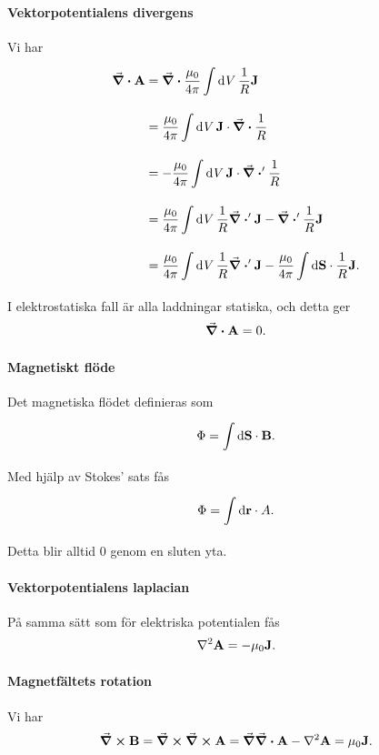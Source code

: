 \paragraph{Vektorpotentialens divergens}
Vi har
\begin{align*}
	\div{\vb{A}} &= \div{\frac{\mu_{0}}{4\pi}\int\limits_{}^{}\dd[]{V}\frac{1}{R}\vb{J}} \\
	             &= \frac{\mu_{0}}{4\pi}\int\limits_{}^{}\dd[]{V}\vb{J}\cdot\div{\frac{1}{R}} \\
	             &= -\frac{\mu_{0}}{4\pi}\int\limits_{}^{}\dd[]{V}\vb{J}\cdot\div'{\frac{1}{R}} \\
	             &= \frac{\mu_{0}}{4\pi}\int\limits_{}^{}\dd[]{V}\frac{1}{R}\div'{\vb{J}} - \div'{\frac{1}{R}\vb{J}} \\
	             &= \frac{\mu_{0}}{4\pi}\int\limits_{}^{}\dd[]{V}\frac{1}{R}\div'{\vb{J}} -  \frac{\mu_{0}}{4\pi}\int\limits_{}^{}\dd{\vb{S}}\cdot \frac{1}{R}\vb{J}.
\end{align*}
I elektrostatiska fall är alla laddningar statiska, och detta ger
\begin{align*}
	\div{\vb{A}} = 0.
\end{align*}

\paragraph{Magnetiskt flöde}
Det magnetiska flödet definieras som
\begin{align*}
	\Phi = \int\limits_{}^{}\dd{\vb{S}}\cdot \vb{B}.
\end{align*}
Med hjälp av Stokes' sats fås
\begin{align*}
	\Phi = \int\limits_{}^{}\dd{\vb{r}}\cdot A.
\end{align*}
Detta blir alltid $0$ genom en sluten yta.

\paragraph{Vektorpotentialens laplacian}
På samma sätt som för elektriska potentialen fås
\begin{align*}
	\laplacian{\vb{A}} = -\mu_{0}\vb{J}.
\end{align*}

\paragraph{Magnetfältets rotation}
Vi har
\begin{align*}
	\curl{\vb{B}} = \curl{\curl{\vb{A}}} = \grad{\div{\vb{A}}} - \laplacian{\vb{A}} = \mu_{0}\vb{J}.
\end{align*}

